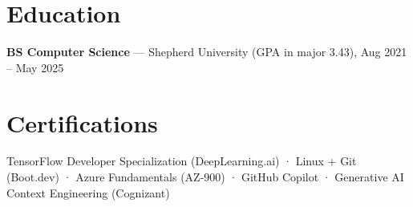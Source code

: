 \documentclass[10pt]{article}
\begin{document}
\section*{Education}
\noindent \textbf{BS Computer Science} — Shepherd University (GPA in major 3.43), Aug 2021 – May 2025\par
\section*{Certifications}
\noindent TensorFlow Developer Specialization (DeepLearning.ai) · Linux + Git (Boot.dev) · Azure Fundamentals (AZ-900) · GitHub Copilot · Generative AI Context Engineering (Cognizant)\par
\end{document}
